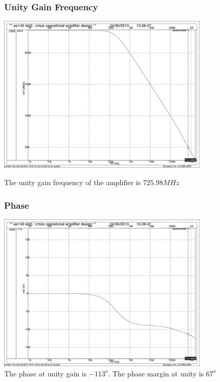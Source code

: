 \documentclass[]{article}
\begin{document}
		\begin{figure}
			\subsubsection{ Unity Gain Frequency}
			\includegraphics[width=0.9\textwidth]{diff_gain_UNITY.pdf}
			\caption{The unity gain frequency of the amplifier is $725.98MHz$}
			\subsubsection{Phase}
			\includegraphics[width=0.9\textwidth]{diff_gain_PHASE.pdf}
			\caption{The phase at unity gain is $-113^{o}$. The phase margin at unity is $67^{o}$}
		\end{figure}
		
\end{document}
